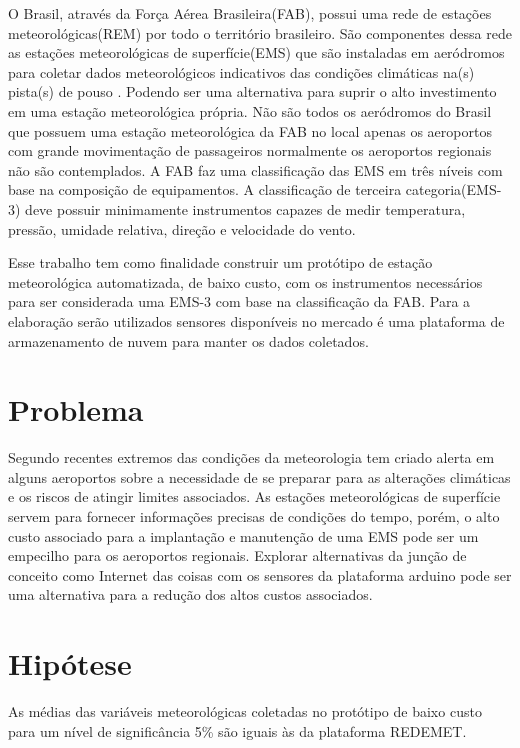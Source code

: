 O Brasil, através da Força Aérea Brasileira(FAB), possui uma rede de estações meteorológicas(REM) por todo o território brasileiro. São componentes dessa rede as estações meteorológicas de superfície(EMS) que são instaladas em aeródromos para coletar dados meteorológicos indicativos das condições climáticas na(s) pista(s) de pouso \cite{henrique2005meteorologia}. Podendo ser uma alternativa para suprir o alto investimento em uma estação meteorológica própria.
Não são todos os aeródromos do Brasil que possuem uma estação meteorológica da FAB no local apenas os aeroportos com grande movimentação de passageiros normalmente os aeroportos regionais não são contemplados. A FAB faz uma classificação das EMS em três níveis com base na composição de equipamentos. A classificação de terceira categoria(EMS-3) deve possuir minimamente instrumentos capazes de medir temperatura, pressão, umidade relativa, direção e velocidade do vento.\cite{BRASILMCA101}

Esse trabalho tem como finalidade construir um protótipo de estação meteorológica automatizada, de baixo custo, com os instrumentos necessários para ser considerada uma EMS-3 com base na classificação da FAB. Para a elaboração serão utilizados sensores disponíveis no mercado é uma plataforma de armazenamento de nuvem para manter os dados coletados. 



\section{Problema}

 Segundo \cite{hileman2014critical} recentes extremos das condições da meteorologia tem criado alerta em alguns aeroportos sobre a necessidade de se preparar para as alterações climáticas e os riscos de atingir limites associados. As estações meteorológicas de superfície servem para fornecer informações precisas de condições do tempo, porém, o alto custo associado para a implantação e manutenção de uma EMS pode ser um empecilho para os aeroportos regionais. Explorar alternativas da junção de conceito como Internet das coisas com os sensores da plataforma arduino pode ser uma alternativa para a redução dos altos custos associados. 


\section{Hipótese}

As médias das variáveis meteorológicas coletadas no protótipo de baixo custo para um nível de significância 5\% são iguais às da plataforma REDEMET.


